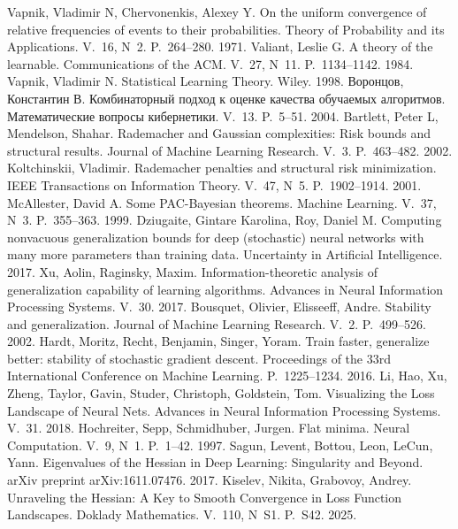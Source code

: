  Vapnik, Vladimir N, Chervonenkis, Alexey Y. On the uniform convergence of relative frequencies of events to their probabilities. Theory of Probability and its Applications. V.~16, N~2. P.~264--280. 1971.
 Valiant, Leslie G. A theory of the learnable. Communications of the ACM. V.~27, N~11. P.~1134--1142. 1984.
 Vapnik, Vladimir N. Statistical Learning Theory. Wiley. 1998.
 Воронцов, Константин В. Комбинаторный подход к оценке качества обучаемых алгоритмов. Математические вопросы кибернетики. V.~13. P.~5--51. 2004.
 Bartlett, Peter L, Mendelson, Shahar. Rademacher and Gaussian complexities: Risk bounds and structural results. Journal of Machine Learning Research. V.~3. P.~463--482. 2002.
 Koltchinskii, Vladimir. Rademacher penalties and structural risk minimization. IEEE Transactions on Information Theory. V.~47, N~5. P.~1902--1914. 2001.
 McAllester, David A. Some PAC-Bayesian theorems. Machine Learning. V.~37, N~3. P.~355--363. 1999.
 Dziugaite, Gintare Karolina, Roy, Daniel M. Computing nonvacuous generalization bounds for deep (stochastic) neural networks with many more parameters than training data. Uncertainty in Artificial Intelligence. 2017.
 Xu, Aolin, Raginsky, Maxim. Information-theoretic analysis of generalization capability of learning algorithms. Advances in Neural Information Processing Systems. V.~30. 2017.
 Bousquet, Olivier, Elisseeff, Andre. Stability and generalization. Journal of Machine Learning Research. V.~2. P.~499--526. 2002.
 Hardt, Moritz, Recht, Benjamin, Singer, Yoram. Train faster, generalize better: stability of stochastic gradient descent. Proceedings of the 33rd International Conference on Machine Learning. P.~1225--1234. 2016.
 Li, Hao, Xu, Zheng, Taylor, Gavin, Studer, Christoph, Goldstein, Tom. Visualizing the Loss Landscape of Neural Nets. Advances in Neural Information Processing Systems. V.~31. 2018.
 Hochreiter, Sepp, Schmidhuber, Jurgen. Flat minima. Neural Computation. V.~9, N~1. P.~1--42. 1997.
 Sagun, Levent, Bottou, Leon, LeCun, Yann. Eigenvalues of the Hessian in Deep Learning: Singularity and Beyond. arXiv preprint arXiv:1611.07476. 2017.
 Kiselev, Nikita, Grabovoy, Andrey. Unraveling the Hessian: A Key to Smooth Convergence in Loss Function Landscapes. Doklady Mathematics. V.~110, N~S1. P.~S42. 2025.

